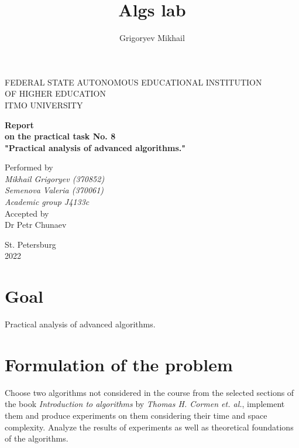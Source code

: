 \documentclass[12pt, a4paper]{article}
\author{Grigoryev Mikhail}
\title{Algs lab}
\begin{document}
\thispagestyle{empty}

\vspace{30mm}

\begin{center}
FEDERAL STATE AUTONOMOUS EDUCATIONAL INSTITUTION \\
OF HIGHER EDUCATION \\
ITMO UNIVERSITY

\vspace{40mm}

{\large \textbf{Report \\
on the practical task No. 8 \\
"Practical analysis of advanced algorithms."}}
\end{center}

\vspace{15mm}

\begin{flushright}
{\large Performed by \\
\textit{Mikhail Grigoryev (370852) \\
Semenova Valeria (370061) \\
Academic group J4133c \\}
Accepted by \\
Dr Petr Chunaev}
\end{flushright}

\vspace{80mm}

\begin{center}
St. Petersburg \\
2022
\end{center}

\newpage

\section*{Goal}

Practical analysis of advanced algorithms.

\section*{Formulation of the problem}

Choose two algorithms not considered in the course from the selected sections of the book \textit{Introduction to algorithms} by \textit{Thomas H. Cormen et. al.}, implement them and produce experiments on them considering their time and space complexity. Analyze the results of experiments as well as theoretical foundations of the algorithms.
\end{document}
